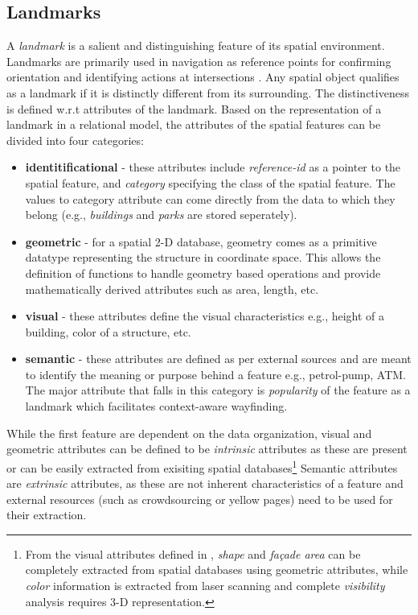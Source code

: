 \documentclass{iitkthesis}
\begin{document}
\subsection{Landmarks}
A \textit{landmark} is a salient and distinguishing feature of its spatial environment. Landmarks are primarily used in navigation as reference points for confirming orientation and identifying actions at intersections \cite{lovelace}. Any spatial object qualifies as a landmark if it is distinctly different from its surrounding.  The distinctiveness is defined w.r.t attributes of the landmark. Based on the representation of a landmark in a relational model, the attributes of the spatial features can be divided into four categories:
\begin{itemize}
  \item \textbf{identitificational} - these attributes include \textit{reference-id} as a pointer to the spatial feature, and \textit{category} specifying the class of the spatial feature. The values to category attribute can come directly from the data to which they belong (e.g., \textit{buildings} and \textit{parks} are stored seperately).
  \item \textbf{geometric} - for a spatial 2-D database, geometry comes as a primitive datatype representing the structure in coordinate space. This allows the definition of functions to handle geometry based operations and provide mathematically derived attributes such as area, length, etc.
  \item \textbf{visual} -  these attributes define the visual characteristics e.g., height of a building, color of a structure, etc.
  \item \textbf{semantic} - these attributes are defined as per external sources and are meant to identify the meaning or purpose behind a feature e.g., petrol-pump, ATM.  The major attribute that falls in this category is \textit{popularity} of the feature as a landmark which facilitates context-aware wayfinding.
\end{itemize}

While the first feature are dependent on the data organization, visual and geometric attributes can be defined to be \textit{intrinsic} attributes as these are present or can be easily extracted from exisiting spatial databases\footnote{From the visual attributes defined in \cite{raubal}, \textit{shape} and \textit{fa\c{c}ade area} can be completely extracted from spatial databases using geometric attributes, while \textit{color} information is extracted from laser scanning and complete \textit{visibility} analysis requires 3-D representation.} Semantic attributes are \textit{extrinsic} attributes, as these are not inherent characteristics of a feature and external resources (such as crowdsourcing or yellow pages) need to be used for their extraction.
\end{document}
